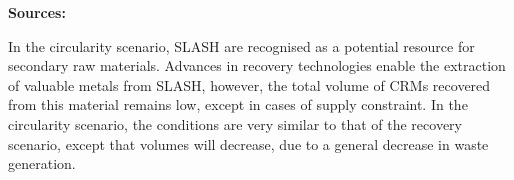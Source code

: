 \wasteSubsubsecSLASH 
\textbf{Sources:}~\cite{eurofer2023steel,euroal2023aluminium,vogl2020steelgreen,visualcapitalist2023steel,asquer2019ash}





In the circularity scenario, SLASH are recognised as a potential resource for secondary raw materials. Advances in recovery technologies enable the extraction of valuable metals from SLASH, however, the total volume of CRMs recovered from this material remains low, except in cases of supply constraint. In the circularity scenario, the conditions are very similar to that of the recovery scenario, except that volumes will decrease, due to a general decrease in waste generation.

